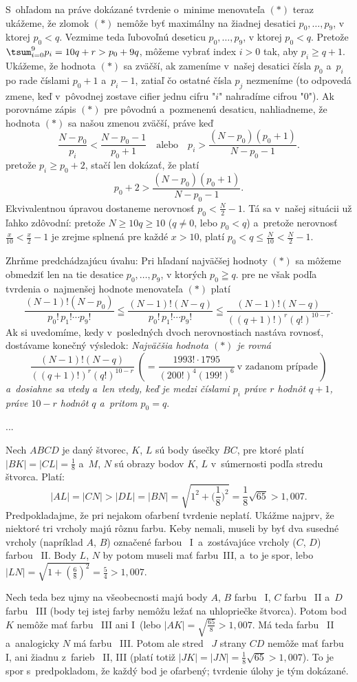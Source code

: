 {S~ohľadom na práve dokázané tvrdenie o~minime menovateľa $(*)$ teraz ukážeme,
že zlomok $(*)$ nemôže byť maximálny na žiadnej desatici $p_0,\dots,p_9$,
v ktorej $p_0<q$.
Vezmime teda ľubovoľnú deseticu $p_0,\dots,p_9$,
v ktorej $p_0<q$. Pretože
$\tsum_{i=0}^9p_i=10q+r>p_0+9q$, môžeme vybrať index
$i>0$ tak, aby $p_i\ge q+1$. Ukážeme, že hodnota
$(*)$ sa zväčší, ak zameníme v~našej desatici čísla $p_0$ a~$p_i$ po
rade číslami $p_0+1$ a~$p_i-1$, zatiaľ čo ostatné čísla $p_j$
nezmeníme (to odpovedá zmene, keď v~pôvodnej zostave cifier jednu
cifru "$i$" nahradíme cifrou "0"). Ak porovnáme zápis $(*)$ pre
pôvodnú a~pozmenenú desaticu, nahliadneme, že hodnota $(*)$ sa našou
zmenou zväčší, práve keď
$$
\frac{N-p_0}{p_i}<\frac{N-p_0-1}{p_0+1}\quad\text{alebo}\quad
p_i>\frac{(N-p_0)(p_0+1)}{N-p_0-1}.
$$
pretože $p_i\ge p_0+2$, stačí len dokázať, že platí
$$
p_0+2>\frac{(N-p_0)(p_0+1)}{N-p_0-1}.
$$
Ekvivalentnou úpravou dostaneme nerovnosť $p_0<\frac N2-1$. Tá sa
v~našej situácii už ľahko zdôvodní: pretože
$N\ge10q\ge10$ ($q\ne0$, lebo $p_0<q$) a~pretože
nerovnosť $\frac x{10}<\frac x2-1$ je zrejme splnená pre
každé $x>10$, platí $p_0<q\le\frac{N}{10}<\frac N2-1$.

Zhrňme predchádzajúcu úvahu: Pri hľadaní najväčšej hodnoty $(*)$ sa
môžeme obmedziť len na tie desatice $p_0,\dots,p_9$, v ktorých
$p_0\geqq q$. pre ne však podľa tvrdenia o~najmenšej hodnote
menovateľa $(*)$ platí
$$
\frac{(N-1)!(N-p_0)}{p_0!\,p_1!\cdots p_9!}\leqq
\frac{(N-1)!(N-q)}{p_0!\,p_1!\cdots p_9!}\leqq
\frac{(N-1)!(N-q)}{((q+1)!)^r(q!)^{10-r}}.
$$
Ak si uvedomíme, kedy v~posledných dvoch nerovnostiach nastáva
rovnosť, dostávame konečný výsledok: {\it Najväčšia hodnota $(*)$
je rovná}
$$
\frac{(N-1)!(N-q)}{((q+1)!)^r(q!)^{10-r}}\ \left(=
\frac{1993!\cdot1795}{(200!)^4(199!)^6}\ \text{v zadanom
prípade}\,\right)
$$
{\it a~dosiahne sa vtedy a~len vtedy, keď je medzi číslami $p_i$ práve
$r$ hodnôt $q+1$, práve $10-r$ hodnôt $q$ a~pritom
$p_0=q$}.
}

{%
...}

{%
Nech $ABCD$ je daný štvorec, $K$, $L$ sú body úsečky $BC$, pre
ktoré platí $|BK|=|CL|= \frac18$ a~$M$, $N$ sú obrazy bodov $K$,
$L$ v~súmernosti podľa stredu štvorca. Platí:
$$
|AL|=|CN|>|DL|=|BN|=\sqrt{1^2
+\Big(\frac18\Big)^2}=\frac18\sqrt{65}>1{,}007 .
$$
Predpokladajme, že pri nejakom ofarbení tvrdenie neplatí. Ukážme
najprv, že niektoré tri vrcholy majú rôznu farbu. Keby nemali,
museli by byť dva susedné vrcholy (napríklad $A$, $B$) označené
farbou~ I~a~zostávajúce vrcholy ($C$, $D$) farbou~ II. Body $L$, $N$ by potom
museli mať farbu~III, a~to je spor, lebo $|LN|=\sqrt{1
+(\frac68)^2}=\frac54>1{,}007$.

Nech teda bez ujmy na všeobecnosti majú body $A$, $B$ farbu~ I,
$C$ farbu~ II a~$D$ farbu~ III (body tej istej farby nemôžu ležať na
uhlopriečke štvorca). Potom bod~ $K$ nemôže mať farbu~ III ani
I~(lebo $|AK|=\sqrt{\frac{65}8}>1{,}007$. Má teda farbu~ II
a~analogicky $N$ má farbu~ III. Potom ale stred~ $J$ strany $CD$
nemôže mať farbu~ I, ani žiadnu z~farieb~ II, III (platí totiž
$|JK|=|JN|=\frac18\sqrt{65}>1{,}007$). To je spor s~predpokladom,
že každý bod je ofarbený; tvrdenie úlohy je tým dokázané.
}

